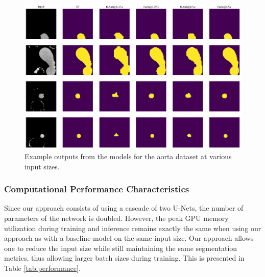 \begin{figure}[t!]
	\includegraphics[width=\textwidth]{images/5/output_examples_aa.png}
	\caption{Example outputs from the models for the aorta dataset at various input sizes. \cite{bencevicSegmentthenSegmentContextPreservingCropBased2023a}\label{fig:examples-aa}}
\end{figure}

\FloatBarrier

\subsubsection{Computational Performance Characteristics}

Since our approach consists of using a cascade of two U-Nets, the number of parameters of the network is doubled. However, the peak GPU memory utilization during training and inference remains exactly the same when using our approach as with a baseline model on the same input size. Our approach allows one to reduce the input size while still maintaining the same segmentation metrics, thus allowing larger batch sizes during training. This is presented in Table \ref{tab:performance}.


